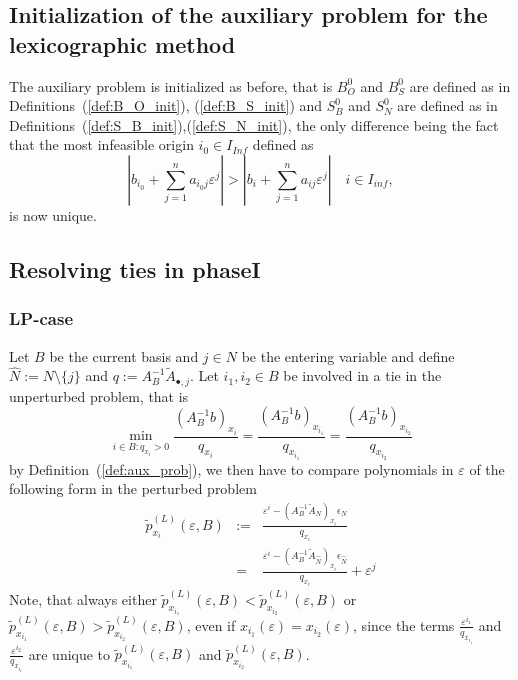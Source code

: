 \documentclass[a4paper]{article}
\begin{document}
\subsection{Initialization of the auxiliary problem for the lexicographic
method}
The auxiliary problem is initialized as before, that is $B_{O}^{0}$ and
$B_{S}^{0}$ are defined as in Definitions~(\ref{def:B_O_init}),
(\ref{def:B_S_init}) and $S_{B}^{0}$ and $S_{N}^{0}$ are defined as in
Definitions~(\ref{def:S_B_init}),(\ref{def:S_N_init}), the only difference being
the fact that the most infeasible origin $i_{0} \in I_{Inf}$ defined as
\begin{equation*}
  \left|b_{i_{0}} + \sum_{j=1}^{n}a_{i_{0}j}\varepsilon^{j} \right|
    >
    \left|b_{i} + \sum_{j=1}^{n}a_{ij}\varepsilon^{j} \right|
    \quad i \in I_{inf},
\end{equation*}
is now unique.

\subsection{Resolving ties in phaseI}
\label{sec:Res_ties_phaseI}
\subsubsection{LP-case}
Let $B$ be the current basis and $j \in N$ be the entering variable
and define $\hat{N}:= N \setminus\{j\}$ and
$q:= A_{B}^{-1}\tilde{A}_{\bullet,j}$.
Let $i_{1}, i_{2} \in B$ be
involved in a tie in the unperturbed problem, that is
\begin{equation*}
  \min_{i \in B: q_{x_{i}} > 0}
  \frac{\left(A_{B}^{-1}b\right)_{x_{i}}}{q_{x_{i}}}
  =
  \frac{\left(A_{B}^{-1}b\right)_{x_{i_{1}}}}{q_{x_{i_{1}}}}
  =
  \frac{\left(A_{B}^{-1}b\right)_{x_{i_{2}}}}{q_{x_{i_{2}}}}
\end{equation*}
by Definition~(\ref{def:aux_prob}),  we then have to compare
polynomials in $\varepsilon$ of the following form in the perturbed problem
\begin{eqnarray}
\tilde{p}_{x_{i}}^{(L)}\left(\varepsilon, B\right) & := &
  \frac{\varepsilon^{i}
  - \left(A_{B}^{-1}\tilde{A}_{N}\right)_{x_{i}}
  \epsilon_{N}}{q_{x_{i}}} \nonumber \\
\label{def:p_x_i_tilde}
 & = &
  \frac{\varepsilon^{i}
  - \left(A_{B}^{-1}\tilde{A}_{\hat{N}}\right)_{x_{i}}
  \epsilon_{\hat{N}}}{q_{x_{i}}}
  + \varepsilon^{j}
\end{eqnarray}
Note, that always either $\tilde{p}_{x_{i_{1}}}^{(L)}
\left(\varepsilon, B\right) <
\tilde{p}_{x_{i_{2}}}^{(L)}\left(\varepsilon, B\right)$ or
$\tilde{p}_{x_{i_{1}}}^{(L)}\left(\varepsilon, B\right) >
\tilde{p}_{x_{i_{2}}}^{(L)}\left(\varepsilon, B\right)$, even if
$x_{i_{1}}(\varepsilon) = x_{i_{2}}(\varepsilon)$,
since the terms $\frac{\varepsilon^{i_{1}}}{q_{x_{i_{1}}}}$ and
$\frac{\varepsilon^{i_{2}}}{q_{x_{i_{1}}}}$ are unique to
$\tilde{p}_{x_{i_{1}}}^{(L)}\left(\varepsilon, B\right)$ and
$\tilde{p}_{x_{i_{2}}}^{(L)}\left(\varepsilon, B\right)$. 
\end{document}
